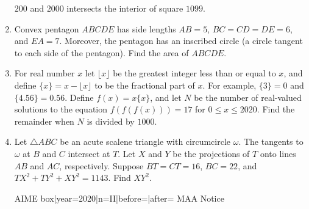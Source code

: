 \documentclass{article}
\begin{document}
\begin{enumerate}[label=\arabic*., itemsep=0.5em]
$200$ and $2000$ intersects the interior of square $1099$.\par \vspace{0.5em}\item Convex pentagon $ABCDE$ has side lengths $AB=5$, $BC=CD=DE=6$, and $EA=7$. Moreover, the pentagon has an inscribed circle (a circle tangent to each side of the pentagon). Find the area of $ABCDE$.\par \vspace{0.5em}\item For real number $x$ let $\lfloor x\rfloor$ be the greatest integer less than or equal to $x$, and define $\{x\} = x - \lfloor x \rfloor$ to be the fractional part of $x$. For example, $\{3\} = 0$ and $\{4.56\} = 0.56$. Define $f(x)=x\{x\}$, and let $N$ be the number of real-valued solutions to the equation $f(f(f(x)))=17$ for $0\leq x\leq 2020$. Find the remainder when $N$ is divided by $1000$.\par \vspace{0.5em}\item Let $\triangle ABC$ be an acute scalene triangle with circumcircle $\omega$. The tangents to $\omega$ at $B$ and $C$ intersect at $T$. Let $X$ and $Y$ be the projections of $T$ onto lines $AB$ and $AC$, respectively. Suppose $BT = CT = 16$, $BC = 22$, and $TX^2 + TY^2 + XY^2 = 1143$. Find $XY^2$.



{{AIME box|year=2020|n=II|before=|after=}}
{{MAA Notice}}\par \vspace{0.5em}\end{enumerate}
\end{document}
